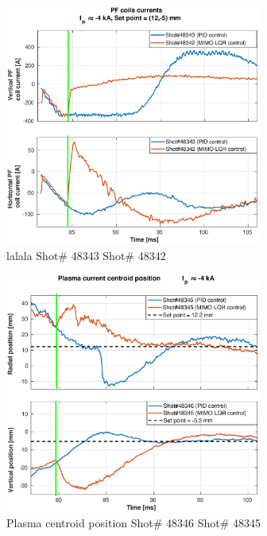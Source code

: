 \begin{figure}
	\centering
	\includegraphics[width=0.75\textwidth]{Chp5/PIDvsMIMO_343_342_curr_2.eps}
	\caption{lalala Shot\# 48343 Shot\# 48342}
\end{figure}

\begin{figure}
	\centering
	\includegraphics[width=0.75\textwidth]{Chp5/PIDvsMIMO_346_345_2.eps}
	\caption{Plasma centroid position Shot\# 48346 Shot\# 48345}
\end{figure}

